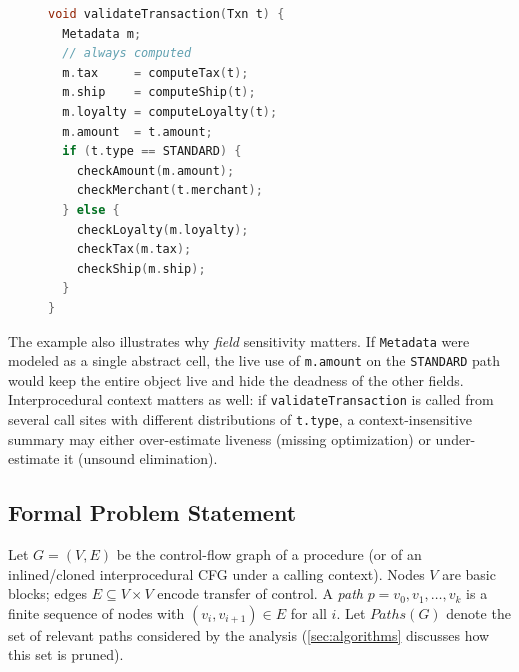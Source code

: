 \documentclass[acmsmall,screen,review,anonymous]{acmart}
\begin{document}
\begin{figure}[t]
\centering
\begin{lstlisting}[language=C, caption={Motivating example: partially dead metadata-field computations.}, label={fig:motivating}]
void validateTransaction(Txn t) {
  Metadata m;
  // always computed
  m.tax     = computeTax(t);
  m.ship    = computeShip(t);
  m.loyalty = computeLoyalty(t);
  m.amount  = t.amount;
  if (t.type == STANDARD) {
    checkAmount(m.amount);
    checkMerchant(t.merchant);
  } else {
    checkLoyalty(m.loyalty);
    checkTax(m.tax);
    checkShip(m.ship);
  }
}
\end{lstlisting}
\end{figure}

The example also illustrates why \emph{field} sensitivity matters. If \texttt{Metadata} were modeled as a single abstract cell, the live use of \texttt{m.amount} on the \texttt{STANDARD} path would keep the entire object live and hide the deadness of the other fields. Interprocedural context matters as well: if \texttt{validateTransaction} is called from several call sites with different distributions of \texttt{t.type}, a context-insensitive summary may either over-estimate liveness (missing optimization) or under-estimate it (unsound elimination).

\subsection{Formal Problem Statement}
Let $G=(V,E)$ be the control-flow graph of a procedure (or of an inlined/cloned interprocedural CFG under a calling context). Nodes $V$ are basic blocks; edges $E\subseteq V\times V$ encode transfer of control. A \emph{path} $p=v_0,v_1,\ldots,v_k$ is a finite sequence of nodes with $(v_i,v_{i+1})\in E$ for all $i$. Let $\mathit{Paths}(G)$ denote the set of relevant paths considered by the analysis (\autoref{sec:algorithms} discusses how this set is pruned).
\end{document}

